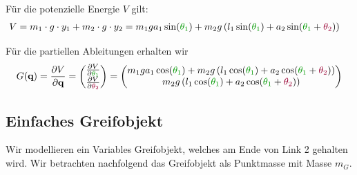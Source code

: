 \documentclass[a4paper, 12pt]{scrartcl}
\newcommand{\gruen}[2][gruen]{\textcolor{#1}{#2}}
\newcommand{\dunkelrot}[2][dunkelrot]{\textcolor{#1}{#2}}
\begin{document}
Für die potenzielle Energie $V$ gilt:
\begin{align*}
    V 
    &= m_1 \cdot g \cdot y_1 + m_2 \cdot g \cdot y_2 
    = m_1  g  a_1 \sin(\gruen{\theta_1}) 
    + m_2  g \left( l_1 \sin(\gruen{\theta_1}) 
    + a_2 \sin(\gruen{\theta_1} + \dunkelrot{\theta_2}) \right)
\end{align*}

Für die partiellen Ableitungen erhalten wir
\begin{align*}
    G(\textbf{q})
    =
    \frac{\partial V}{\partial \textbf{q}}
    =
    \begin{pmatrix}
        \frac{\partial V}{\partial \gruen{\theta_1}} \\
        \frac{\partial V}{\partial \dunkelrot{\theta_2}}
    \end{pmatrix}
    =
    \begin{pmatrix}
        m_1  g  a_1 \cos(\gruen{\theta_1}) + m_2  g \left( l_1 \cos(\gruen{\theta_1}) 
        + a_2 \cos(\gruen{\theta_1} + \dunkelrot{\theta_2}) \right) \\
        m_2  g \left( l_1 \cos(\gruen{\theta_1}) + a_2 \cos(\gruen{\theta_1} 
        + \dunkelrot{\theta_2}) \right)
    \end{pmatrix}
\end{align*}

\newpage

\subsection{Einfaches Greifobjekt}
Wir modellieren ein Variables Greifobjekt, welches am Ende von Link 2 gehalten wird. 
Wir betrachten nachfolgend das Greifobjekt als Punktmasse mit Masse $m_G$. 
\end{document}
